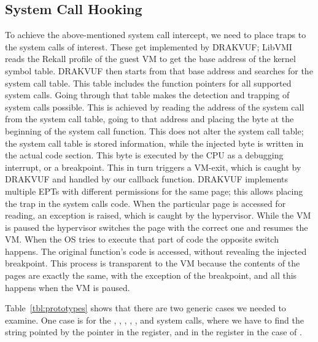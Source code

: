 \begin{table}[ht]
\begin{tabular}{ccccccc}
	\bottomrule
\end{tabular}
\end{table}

\subsection{System Call Hooking}\label{sub:hooking}

To achieve the above-mentioned system call intercept, we need to place traps to the system calls of interest. These get implemented by DRAKVUF; LibVMI reads the Rekall profile of the guest \ac{VM} to get the base address of the kernel symbol table. DRAKVUF then starts from that base address and searches for the system call table. This table includes the function pointers for all supported system calls. Going through that table makes the detection and trapping of system calls possible. This is achieved by reading the address of the system call from the system call table, going to that address and placing the  byte at the beginning of the system call function. This does not alter the system call table; the system call table is stored information, while the injected byte is written in the actual code section. This byte is executed by the \ac{CPU} as a debugging interrupt, or a breakpoint. This in turn triggers a VM-exit, which is caught by DRAKVUF and handled by our callback function. DRAKVUF implements multiple \ac{EPT}s with different permissions for the same page; this allows placing the trap in the system calls code. When the particular page is accessed for reading, an exception is raised, which is caught by the hypervisor. While the \ac{VM} is paused the hypervisor switches the page with the correct one and resumes the \ac{VM}. When the \ac{OS} tries to execute that part of code the opposite switch happens. The original function's code is accessed, without revealing the injected breakpoint. This process is transparent to the \ac{VM} because the contents of the pages are exactly the same, with the exception of the breakpoint, and all this happens when the \ac{VM} is paused. 

\par Table~\ref{tbl:prototypes} shows that there are two generic cases we needed to examine. One case is for the , , , , , and  system calls, where we have to find the string pointed by the pointer in the  register, and in the  register in the case of . 

